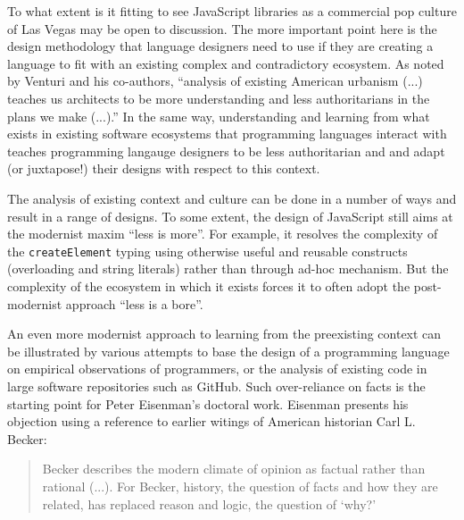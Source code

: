 To what extent is it fitting to see JavaScript libraries as a commercial pop culture of Las Vegas
may be open to discussion. The more important point here is the design methodology that
language designers need to use if they are creating a language to fit with an existing
complex and contradictory ecosystem. As noted by Venturi and his co-authors,
``analysis of existing American urbanism (...) teaches us architects to be more
understanding and less authoritarians in the plans we make (...).''
In the same way, understanding and learning from what exists in existing software ecosystems
that programming languages interact with teaches programming langauge designers to be
less authoritarian and and adapt (or juxtapose!) their designs with respect to this context.


The analysis of existing context and culture can be done in a number of ways and result in
a range of designs. To some extent, the design of JavaScript still aims at the modernist maxim
``less is more''. For example, it resolves the complexity of the \texttt{createElement} typing
using otherwise useful and reusable constructs (overloading and string literals) rather than
through ad-hoc mechanism. But the complexity of the ecosystem in which it exists forces it to
often adopt the post-modernist approach ``less is a bore''.

An even more modernist approach to learning
from the preexisting context can be illustrated by various attempts to base the design of a
programming language on empirical observations of programmers, or the analysis of existing code
in large software repositories such as GitHub.
Such over-reliance on facts is the starting point for Peter Eisenman's doctoral work. Eisenman
presents his objection using a reference to earlier witings of American historian Carl L. Becker:

\begin{quote}
Becker describes the modern climate of opinion as factual rather than
rational (...). For Becker, history, the question of facts and how they are related,
has replaced reason and logic, the question of `why?'
\end{quote}

